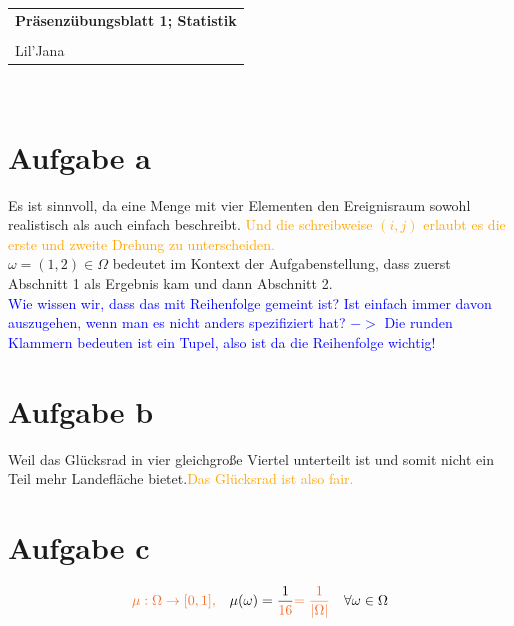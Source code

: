\documentclass{article} %
\newcommand{\titulo}{Präsenzübungsblatt 1; Statistik}
\newcommand{\nombre}{Lil'Jana}
\begin{document}

\begin{tabular}{p{12cm}}
{{\Large\bf\titulo}}\\
\vspace{0.2cm}\\
 {\large\nombre}\\
\end{tabular}
\vspace{0.2cm}\\
\section{Aufgabe a}
Es ist sinnvoll, da eine Menge mit vier Elementen den Ereignisraum sowohl realistisch als auch einfach beschreibt. \textcolor{Orange}{Und die schreibweise $(i,j)$ erlaubt es die erste und zweite Drehung zu unterscheiden.} \\
$\omega = (1,2) \in \Omega$ bedeutet im Kontext der Aufgabenstellung, dass zuerst Abschnitt 1 als Ergebnis kam und dann Abschnitt 2. \\
\textcolor{Blue}{Wie wissen wir, dass das mit Reihenfolge gemeint ist? Ist einfach immer davon auszugehen, wenn man es nicht anders spezifiziert hat? $->$ Die runden Klammern bedeuten ist ein Tupel, also ist da die Reihenfolge wichtig!}
\section{Aufgabe b}
Weil das Glücksrad in vier gleichgroße Viertel unterteilt ist und somit nicht ein Teil mehr Landefläche bietet.\textcolor{Orange}{Das Glücksrad ist also fair.}

\section{Aufgabe c}

\begin{equation*}
   \textcolor{Orange}{\mu: \Omega \rightarrow [0,1],} \quad \mu(\omega) = \frac{1}{\textcolor{Orange}{16}}  \textcolor{Orange}{ = \frac{1}{|\Omega|}} \quad \forall \omega \in \Omega
\end{equation*}
\end{document}
